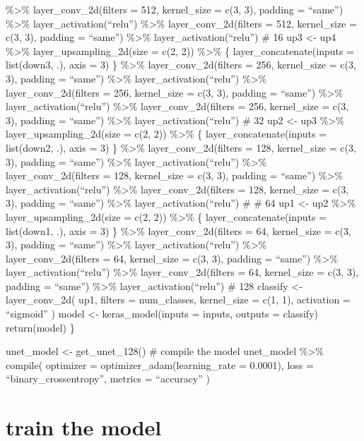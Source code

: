 \documentclass[
]{article}
\begin{document}
{{{{\%\textgreater\% layer\_conv\_2d(filters = 512, kernel\_size = c(3, 3),
padding = ``same'') \%\textgreater\% layer\_activation(``relu'')
\%\textgreater\% layer\_conv\_2d(filters = 512, kernel\_size = c(3, 3),
padding = ``same'') \%\textgreater\% layer\_activation(``relu'') \# 16
up3 \textless- up4 \%\textgreater\% layer\_upsampling\_2d(size = c(2,
2)) \%\textgreater\% \{ layer\_concatenate(inputs = list(down3, .), axis
= 3) \} \%\textgreater\% layer\_conv\_2d(filters = 256, kernel\_size =
c(3, 3), padding = ``same'') \%\textgreater\%
layer\_activation(``relu'') \%\textgreater\% layer\_conv\_2d(filters =
256, kernel\_size = c(3, 3), padding = ``same'') \%\textgreater\%
layer\_activation(``relu'') \%\textgreater\% layer\_conv\_2d(filters =
256, kernel\_size = c(3, 3), padding = ``same'') \%\textgreater\%
layer\_activation(``relu'') \# 32 up2 \textless- up3 \%\textgreater\%
layer\_upsampling\_2d(size = c(2, 2)) \%\textgreater\% \{
layer\_concatenate(inputs = list(down2, .), axis = 3) \}
\%\textgreater\% layer\_conv\_2d(filters = 128, kernel\_size = c(3, 3),
padding = ``same'') \%\textgreater\% layer\_activation(``relu'')
\%\textgreater\% layer\_conv\_2d(filters = 128, kernel\_size = c(3, 3),
padding = ``same'') \%\textgreater\% layer\_activation(``relu'')
\%\textgreater\% layer\_conv\_2d(filters = 128, kernel\_size = c(3, 3),
padding = ``same'') \%\textgreater\% layer\_activation(``relu'') \# \#
64 up1 \textless- up2 \%\textgreater\% layer\_upsampling\_2d(size = c(2,
2)) \%\textgreater\% \{ layer\_concatenate(inputs = list(down1, .), axis
= 3) \} \%\textgreater\% layer\_conv\_2d(filters = 64, kernel\_size =
c(3, 3), padding = ``same'') \%\textgreater\%
layer\_activation(``relu'') \%\textgreater\% layer\_conv\_2d(filters =
64, kernel\_size = c(3, 3), padding = ``same'') \%\textgreater\%
layer\_activation(``relu'') \%\textgreater\% layer\_conv\_2d(filters =
64, kernel\_size = c(3, 3), padding = ``same'') \%\textgreater\%
layer\_activation(``relu'') \# 128 classify \textless- layer\_conv\_2d(
up1, filters = num\_classes, kernel\_size = c(1, 1), activation =
``sigmoid'' ) model \textless- keras\_model(inputs = inputs, outputs =
classify) return(model) \}

unet\_model \textless- get\_unet\_128() \# compile the model unet\_model
\%\textgreater\% compile( optimizer = optimizer\_adam(learning\_rate =
0.0001), loss = ``binary\_crossentropy'', metrics = ``accuracy'' )

\hypertarget{train-the-model}{%
\section{train the model}\label{train-the-model}}

}}}}
\end{document}
